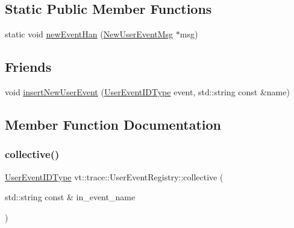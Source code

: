 \subsection*{Static Public Member Functions}
\begin{DoxyCompactItemize}
\item 
static void \hyperlink{structvt_1_1trace_1_1_user_event_registry_a314bba11008b65bce09a560d3107a5c5}{new\+Event\+Han} (\hyperlink{structvt_1_1trace_1_1_user_event_registry_1_1_new_user_event_msg}{New\+User\+Event\+Msg} $\ast$msg)
\end{DoxyCompactItemize}
\subsection*{Friends}
\begin{DoxyCompactItemize}
\item 
void \hyperlink{structvt_1_1trace_1_1_user_event_registry_a17caa1eeb27fd6a4af8786a7f0679d77}{insert\+New\+User\+Event} (\hyperlink{namespacevt_1_1trace_a5908920d051c144c89f17c69ed262350}{User\+Event\+I\+D\+Type} event, std\+::string const \&name)
\end{DoxyCompactItemize}


\subsection{Member Function Documentation}
\mbox{\label{structvt_1_1trace_1_1_user_event_registry_a351d80d6d91bcd47e9fff0f6ed18df4d}} 
\subsubsection{\texorpdfstring{collective()}{collective()}}
{\footnotesize\ttfamily \hyperlink{namespacevt_1_1trace_a5908920d051c144c89f17c69ed262350}{User\+Event\+I\+D\+Type} vt\+::trace\+::\+User\+Event\+Registry\+::collective (\begin{DoxyParamCaption}\item[{std\+::string const \&}]{in\+\_\+event\+\_\+name }\end{DoxyParamCaption})}

\mbox{\label{structvt_1_1trace_1_1_user_event_registry_ac219431476480a6c9fe10ede067b33d2}} 
